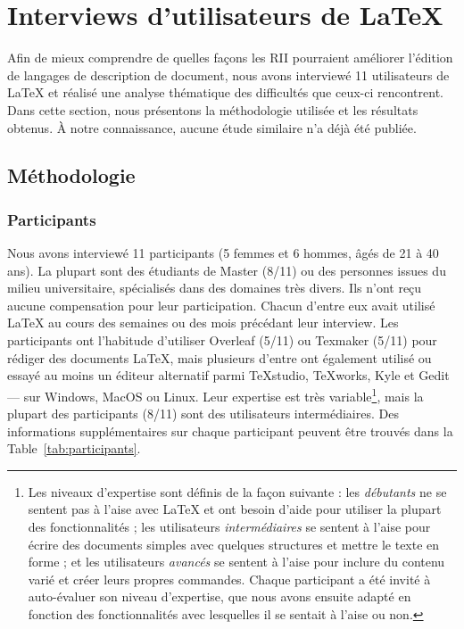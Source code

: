 
\section{Interviews d'utilisateurs de \LaTeX{}}
\label{sec:interviews}

Afin de mieux comprendre de quelles façons les RII pourraient améliorer l'édition de langages de description de document, nous avons interviewé 11 utilisateurs de \LaTeX{} et réalisé une analyse thématique des difficultés que ceux-ci rencontrent.
Dans cette section, nous présentons la méthodologie utilisée et les résultats obtenus.
À notre connaissance, aucune étude similaire n'a déjà été publiée.


\subsection{Méthodologie}

\subsubsection{Participants}
Nous avons interviewé 11 participants (5 femmes et 6 hommes, âgés de 21 à 40 ans).
La plupart sont des étudiants de Master (8/11) ou des personnes issues du milieu universitaire, spécialisés dans des domaines très divers.
Ils n'ont reçu aucune compensation pour leur participation.
Chacun d'entre eux avait utilisé \LaTeX{} au cours des semaines ou des mois précédant leur interview.
Les participants ont l'habitude d'utiliser Overleaf (5/11) ou Texmaker (5/11) pour rédiger des documents \LaTeX{}, mais plusieurs d'entre ont également utilisé ou essayé au moins un éditeur alternatif parmi TeXstudio, TeXworks, Kyle et Gedit --- sur Windows, MacOS ou Linux.
Leur expertise est très variable\footnote{Les niveaux d'expertise sont définis de la façon suivante : les \emph{débutants} ne se sentent pas à l'aise avec \LaTeX{} et ont besoin d'aide pour utiliser la plupart des fonctionnalités ; les utilisateurs \emph{intermédiaires} se sentent à l'aise pour écrire des documents simples avec quelques structures et mettre le texte en forme ; et les utilisateurs \emph{avancés} se sentent à l'aise pour inclure du contenu varié et créer leurs propres commandes. Chaque participant a été invité à auto-évaluer son niveau d'expertise, que nous avons ensuite adapté en fonction des fonctionnalités avec lesquelles il se sentait à l'aise ou non.}, mais la plupart des participants (8/11) sont des utilisateurs intermédiaires.
Des informations supplémentaires sur chaque participant peuvent être trouvés dans la Table~\ref{tab:participants}.

